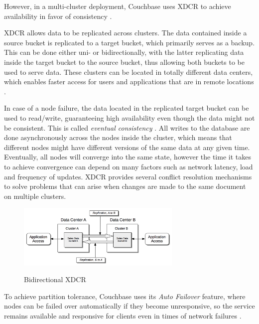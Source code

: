 However, in a multi-cluster deployment, Couchbase uses \ac{XDCR} to achieve availability in favor of consistency \parencite{CAPXDCR.2014}.

\ac{XDCR} allows data to be replicated across clusters. The data contained inside a source bucket is replicated to a target bucket, which primarily serves as a backup. This can be done either uni- or bidirectionally, with the latter replicating data inside the target bucket to the source bucket, thus allowing both buckets to be used to serve data. These clusters can be located in totally different data centers, which enables faster access for users and applications that are in remote locations \parencite{XDCR.20230402}.

In case of a node failure, the data located in the replicated target bucket can be used to read/write, guaranteeing high availability even though the data might not be consistent. This is called \textit{eventual consistency} \parencite{DonPintoPrincipalProductManager.2014}. All writes to the database are done asynchronously across the nodes inside the cluster, which means that different nodes might have different versions of the same data at any given time. Eventually, all nodes will converge into the same state, however the time it takes to achieve convergence can depend on many factors such as network latency, load and frequency of updates. \ac{XDCR} provides several conflict resolution mechanisms to solve problems that can arise when changes are made to the same document on multiple clusters.

\begin{figure}[H]
    \centering
    \caption{Bidirectional \ac{XDCR} \parencite{XDCR.20230402}}
    \includegraphics[width=0.7\textwidth]{images/bidirectional-xdcr.png}
    \label{fig:BidiXDCR}
\end{figure}

To achieve partition tolerance, Couchbase uses its \textit{Auto Failover} feature, where nodes can be failed over automatically if they become unresponsive, so the service remains available and responsive for clients even in times of network failures \parencite{Autofailover.20230402}.

